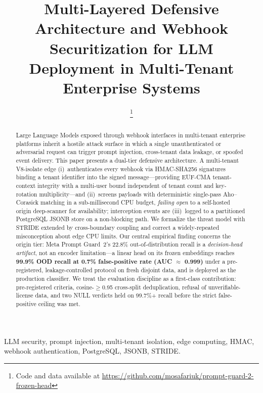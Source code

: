 \documentclass[conference]{IEEEtran}
\begin{document}
\title{Multi-Layered Defensive Architecture and Webhook Securitization for LLM
Deployment in Multi-Tenant Enterprise Systems}

\author{
\thanks{Code and data available at \url{https://github.com/mosafariuk/prompt-guard-2-frozen-head}}}

\maketitle

\begin{abstract}
Large Language Models exposed through webhook interfaces in multi-tenant enterprise
platforms inherit a hostile attack surface in which a single unauthenticated or
adversarial request can trigger prompt injection, cross-tenant data leakage, or
spoofed event delivery. This paper presents a dual-tier defensive architecture. A
multi-tenant V8-isolate edge (i)~authenticates every webhook via HMAC-SHA256 signatures
binding a tenant identifier into the signed message---providing EUF-CMA tenant-context
integrity with a multi-user bound independent of tenant count and key-rotation
multiplicity---and (ii)~screens payloads with deterministic single-pass Aho--Corasick
matching in a sub-millisecond CPU budget, \emph{failing open} to a self-hosted origin
deep-scanner for availability; interception events are (iii)~logged to a partitioned
PostgreSQL JSONB store on a non-blocking path. We formalize the threat model with STRIDE
extended by cross-boundary coupling and correct a widely-repeated misconception about
edge CPU limits. Our central empirical finding concerns the origin tier: Meta Prompt
Guard~2's 22.8\% out-of-distribution recall is a \emph{decision-head artifact}, not an
encoder limitation---a linear head on its frozen embeddings reaches \textbf{99.9\% OOD
recall at 0.7\% false-positive rate (AUC $\approx$ 0.999)} under a pre-registered,
leakage-controlled protocol on fresh disjoint data, and is deployed as the production
classifier. We treat the evaluation discipline as a first-class contribution:
pre-registered criteria, cosine-$\ge$0.95 cross-split deduplication, refusal of
unverifiable-license data, and two NULL verdicts held on 99.7\%+ recall before the
strict false-positive ceiling was met.
\end{abstract}

\begin{IEEEkeywords}
LLM security, prompt injection, multi-tenant isolation, edge computing, HMAC,
webhook authentication, PostgreSQL, JSONB, STRIDE.
\end{IEEEkeywords}



% 
% 
\end{document}
